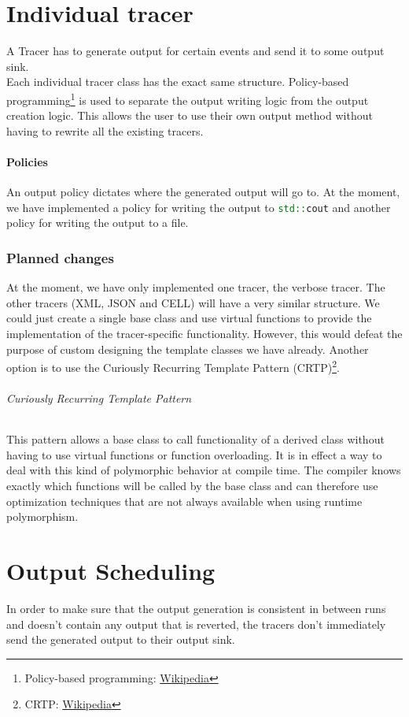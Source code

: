 \documentclass[12pt]{article}
\newcommand{\inlinecpp}[1]{\lstinline[language=c++]{#1}}
\begin{document}
\part*{Individual tracer}
A Tracer has to generate output for certain events and send it to some output sink.\\
Each individual tracer class has the exact same structure. Policy-based programming\footnote{Policy-based programming: \href{http://en.wikipedia.org/wiki/Policy-based_design}{Wikipedia}} is used to separate the output writing logic from the output creation logic. This allows the user to use their own output method without having to rewrite all the existing tracers.\\
\subsection{Policies}
An output policy dictates where the generated output will go to. At the moment, we have implemented a policy for writing the output to \inlinecpp{std::cout} and another policy for writing the output to a file.
\section{Planned changes}
At the moment, we have only implemented one tracer, the verbose tracer. The other tracers (XML, JSON and CELL) will have a very similar structure. We could just create a single base class and use virtual functions to provide the implementation of the tracer-specific functionality. However, this would defeat the purpose of custom designing the template classes we have already. Another option is to use the Curiously Recurring Template Pattern (CRTP)\footnote{CRTP: \href{http://en.wikipedia.org/wiki/Curiously_recurring_template_pattern}{Wikipedia}}.
\paragraph{Curiously Recurring Template Pattern} This pattern allows a base class to call functionality of a derived class without having to use virtual functions or function overloading. It is in effect a way to deal with this kind of polymorphic behavior at compile time. The compiler knows exactly which functions will be called by the base class and can therefore use optimization techniques that are not always available when using runtime polymorphism.

\part*{Output Scheduling}
In order to make sure that the output generation is consistent in between runs and doesn't contain any output that is reverted, the tracers don't immediately send the generated output to their output sink.
\end{document}
